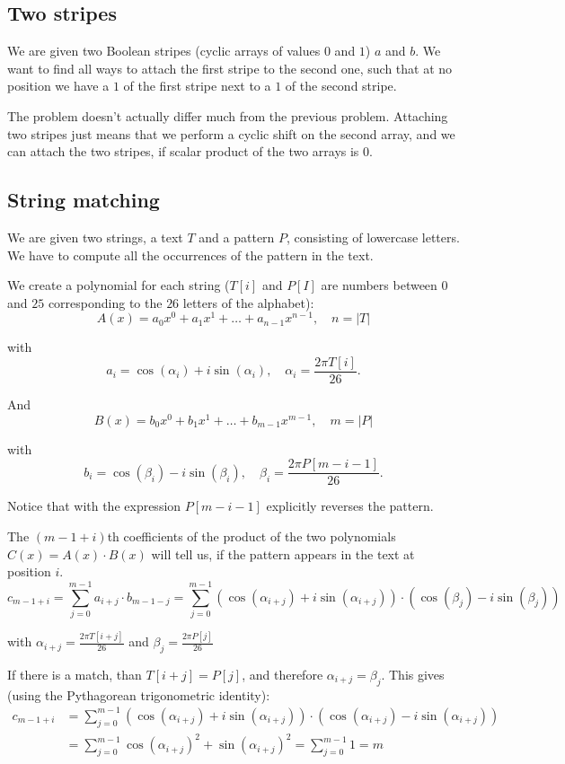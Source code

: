 \documentclass[28]{report}
\begin{document}
\subsection{Two stripes}

We are given two Boolean stripes (cyclic arrays of values $0$ and $1$) $a$ and $b$. We want to find all ways to attach the first stripe to the second one, such that at no position we have a $1$ of the first stripe next to a $1$ of the second stripe.

The problem doesn't actually differ much from the previous problem. Attaching two stripes just means that we perform a cyclic shift on the second array, and we can attach the two stripes, if scalar product of the two arrays is $0$.

\subsection{String matching}

We are given two strings, a text $T$ and a pattern $P$, consisting of lowercase letters. We have to compute all the occurrences of the pattern in the text.

We create a polynomial for each string ($T[i]$ and $P[I]$ are numbers between $0$ and $25$ corresponding to the $26$ letters of the alphabet):
$$A(x) = a_0 x^0 + a_1 x^1 + \dots + a_{n-1} x^{n-1}, \quad n = |T|$$

with
$$a_i = \cos(\alpha_i) + i \sin(\alpha_i), \quad \alpha_i = \frac{2 \pi T[i]}{26}.$$

And
$$B(x) = b_0 x^0 + b_1 x^1 + \dots + b_{m-1} x^{m-1}, \quad m = |P|$$

with
$$b_i = \cos(\beta_i) - i \sin(\beta_i), \quad \beta_i = \frac{2 \pi P[m-i-1]}{26}.$$

Notice that with the expression $P[m-i-1]$ explicitly reverses the pattern.

The $(m-1+i)$th coefficients of the product of the two polynomials $C(x) = A(x) \cdot B(x)$ will tell us, if the pattern appears in the text at position $i$.
$$c_{m-1+i} = \sum_{j = 0}^{m-1} a_{i+j} \cdot b_{m-1-j} = \sum_{j=0}^{m-1} \left(\cos(\alpha_{i+j}) + i \sin(\alpha_{i+j})\right) \cdot \left(\cos(\beta_j) - i \sin(\beta_j)\right)$$

with $\alpha_{i+j} = \frac{2 \pi T[i+j]}{26}$ and $\beta_j = \frac{2 \pi P[j]}{26}$

If there is a match, than $T[i+j] = P[j]$, and therefore $\alpha_{i+j} = \beta_j$. This gives (using the Pythagorean trigonometric identity):
\begin{equation*}
    \begin{align*}
     c_{m-1+i} &= \sum_{j = 0}^{m-1} \left(\cos(\alpha_{i+j}) + i \sin(\alpha_{i+j})\right) \cdot \left(\cos(\alpha_{i+j}) - i \sin(\alpha_{i+j})\right) \\
     &= \sum_{j = 0}^{m-1} \cos(\alpha_{i+j})^2 + \sin(\alpha_{i+j})^2 = \sum_{j = 0}^{m-1} 1 = m 
    \end{align*}
\end{equation*}
\end{document}
